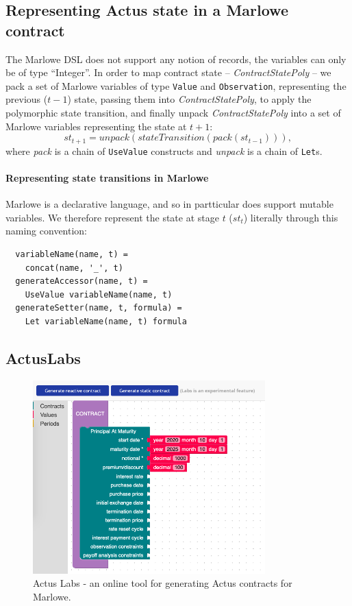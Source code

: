 \documentclass[runningheads]{llncs}
\newcommand{\ident}[1]{\mbox{\emph{#1}}}
\begin{document}
\subsection{Representing Actus state in a Marlowe contract}

The Marlowe DSL does not support any notion of records,
the variables can only be of type ``Integer''. In order to
map contract state -- \emph{ContractStatePoly} -- we pack a set of Marlowe
variables of type \texttt{Value} and \texttt{Observation}, representing the previous ($t-1$) state, passing them into
\emph{ContractStatePoly}, to apply the polymorphic state transition, and
finally unpack \emph{ContractStatePoly} into a set of Marlowe variables representing the 
 state at $t+1$:
\noindent 
\begin{equation}
st_{t+1}=unpack(stateTransition(pack(st_{t-1}))),
\end{equation}
\noindent
where \emph{pack} is a chain of \texttt{UseValue} constructs and \ident{unpack} is a chain of
\texttt{Let}s.

\paragraph{Representing state transitions in Marlowe}

Marlowe is a declarative language, and so in partticular does support mutable variables. We therefore represent the state at stage $t$ ($st_{t}$) literally through this naming convention:

\begin{verbatim}
  variableName(name, t) = 
    concat(name, '_', t) 
  generateAccessor(name, t) = 
    UseValue variableName(name, t) 
  generateSetter(name, t, formula) = 
    Let variableName(name, t) formula 
\end{verbatim}


\subsection{ActusLabs}

\begin{figure}[t]
\includegraphics[width=0.8\textwidth]{images/labs.png}
\caption{Actus Labs - an online tool for generating Actus contracts for Marlowe.} 
\label{fig3} 
\end{figure} 
\end{document}
